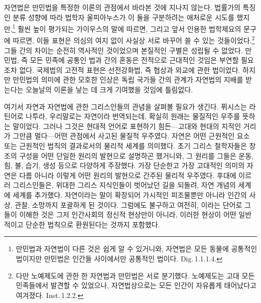 자연법은 만민법을 특정한 이론의 관점에서 바라본 것에
지나지 않는다.
법률가의 특징인 분류 성향에 따라
법학자 울피아누스가
이 둘을 구분하려는 애처로운 시도를 했지만,\footnote{%
  만민법과 자연법이 다른 것은 쉽게 알 수 있거니와,
  자연법은 모든 동물에 공통적인 법이지만 만민법은 인간들 사이에서만
  공통적인 법이다. Dig.\,1.1.1.4.}
훨씬 높이 평가되는 가이우스의 말에 따르면, 그리고
앞서 인용한 법학제요의 문구에 따르면,
이들 표현은 의심의 여지 없이 사실상 서로 바꾸어 쓸 수 있는
것들이었다.\footnote{다만 노예제도에 관한 한 자연법과 만민법은
서로 분기했다. 노예제도는 고대 모든 민족들에서 발견할 수 있었으나,
자연법상으로는 모든 인간이 자유롭게 태어났다고 여겨졌다. Inst.\,1.2.2.}
그들 간의 차이는 순전히 역사적인 것이었으며
본질적인 구별은 성립될 수 없었다.
만민법, 즉 모든 민족에 공통인 법과
 간의 혼동은 전적으로 근대적인 것임은
부연할 필요조차 없다.
국제법의 고전적 표현은
선전강화법,
즉 협상과 외교에 관한 법이었다.
하지만 만민법의 의미에 관한 모호한 인상은
독립 국가들 간의 관계가 자연법의 지배를 받는다는 오늘날의 이론을
낳는 데 크게 기여했을 것임에 틀림없다.

여기서
자연과 자연법에 관한 그리스인들의 관념을 살펴볼 필요가 생긴다.
퓌시스는 라틴어로 나투라, 우리말로는
자연이라 번역되는데,
확실히 원래는 물질적인 우주를 뜻하는 말이었다.
그러나 그것은 현대적 언어로 표현하기 힘든---고대와 현대의 지적인 거리가
그만큼 멀다---어떤 관점에서 사고된
물질적 우주였다.
자연은 어떤 근원적인 요소 또는 근원적인 법칙의 결과로서의
물리적 세계를 의미했다.
초기 그리스 철학자들은
창조의 구성을 어떤 단일한 원리의 발현으로 설명하곤 했거니와,
그 원리를 그들은 운동, 힘, 불, 습기, 생성 등으로 다양하게 주장했다.
가장 단순한고 가장 고대적인 의미의 자연은 다름 아니라
이렇게 어떤 원리의 발현으로
간주된 물리적 우주였다.
후대에 이르러 그리스인들은, 위대한 그리스 지식인들이 벗어났던 길을 되돌려,
자연 개념의  세계에  세계를 추가했다.
자연이라는 말이 확장되어 가시적인 피조물뿐만 아니라 인간의 사상, 관찰, 소망까지
포괄하게 된 것이다.
그럼에도 불구하고 여전히, 이라는 단어로 그들이 이해한 것은
그저 인간사회의 정신적 현상만이 아니라,
이러한 현상이 어떤 일반적이고 단순한 법칙으로 환원된다는 것까지 포함했다.

